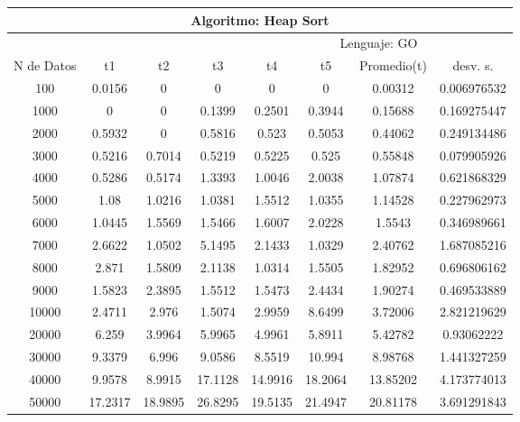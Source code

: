 \documentclass{article}
\begin{document}
\begin{table}[]
\begin{tabular}{|c|c|c|c|c|c|c|c| }
    \end{tabular}
    \end{table}

             \begin{table}[]
        \begin{tabular}{|c|c|c|c|c|c|c|c| }
            \hline
            \multicolumn{8}{|c|}{Algoritmo: Heap Sort} \\ \hline
            \multicolumn{4}{|c|}{} & \multicolumn{4}{c|}{Lenguaje: GO} \\ \hline
              N de Datos &     t1    &  t2         &  t3          &   t4        &    t5     &   Promedio(t)       & desv. s. \\ \hline
                100	&0.0156	&0	&0	&0	&0	&0.00312	&0.006976532\\ \hline
                1000	&0	&0	&0.1399	&0.2501	&0.3944	&0.15688	&0.169275447\\ \hline
                2000	&0.5932	&0	&0.5816	&0.523	&0.5053	&0.44062	&0.249134486\\ \hline
                3000	&0.5216	&0.7014	&0.5219	&0.5225	&0.525	&0.55848	&0.079905926\\ \hline
                4000	&0.5286	&0.5174	&1.3393	&1.0046	&2.0038	&1.07874	&0.621868329\\ \hline
                5000	&1.08	&1.0216	&1.0381	&1.5512	&1.0355	&1.14528	&0.227962973\\ \hline
                6000	&1.0445	&1.5569	&1.5466	&1.6007	&2.0228	&1.5543	&0.346989661\\ \hline
                7000	&2.6622	&1.0502	&5.1495	&2.1433	&1.0329	&2.40762	&1.687085216\\ \hline
                8000	&2.871	&1.5809	&2.1138	&1.0314	&1.5505	&1.82952	&0.696806162\\ \hline
                9000	&1.5823	&2.3895	&1.5512	&1.5473	&2.4434	&1.90274	&0.469533889\\ \hline
                10000	&2.4711	&2.976	&1.5074	&2.9959	&8.6499	&3.72006	&2.821219629\\ \hline
                20000	&6.259	&3.9964	&5.9965	&4.9961	&5.8911	&5.42782	&0.93062222\\ \hline
                30000	&9.3379	&6.996	&9.0586	&8.5519	&10.994	&8.98768	&1.441327259\\ \hline
                40000	&9.9578	&8.9915	&17.1128	&14.9916	&18.2064	&13.85202&	4.173774013\\ \hline
                50000	&17.2317	&18.9895	&26.8295	&19.5135	&21.4947	&20.81178&	3.691291843\\ \hline

\end{tabular}
\end{table}
\end{document}
